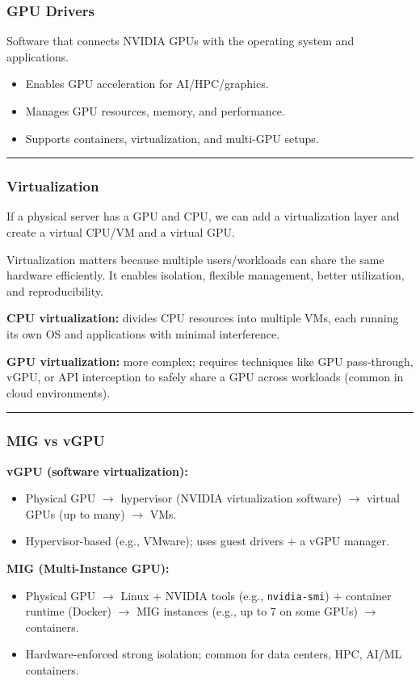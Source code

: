 \documentclass[11pt]{article}
\newcommand{\notespace}{
\vspace{0.8cm}
\hrule
\vspace{0.8cm}
}
\begin{document}
\subsubsection{GPU Drivers}
Software that connects NVIDIA GPUs with the operating system and applications.
\begin{itemize}
\item Enables GPU acceleration for AI/HPC/graphics.
\item Manages GPU resources, memory, and performance.
\item Supports containers, virtualization, and multi-GPU setups.
\end{itemize}
\notespace

\subsubsection{Virtualization}
If a physical server has a GPU and CPU, we can add a virtualization layer and create a virtual CPU/VM and a virtual GPU.

Virtualization matters because multiple users/workloads can share the same hardware efficiently. It enables isolation, flexible management, better utilization, and reproducibility.

\textbf{CPU virtualization:} divides CPU resources into multiple VMs, each running its own OS and applications with minimal interference.

\textbf{GPU virtualization:} more complex; requires techniques like GPU pass-through, vGPU, or API interception to safely share a GPU across workloads (common in cloud environments).
\notespace

\subsubsection{MIG vs vGPU}
\textbf{vGPU (software virtualization):}
\begin{itemize}
\item Physical GPU $\rightarrow$ hypervisor (NVIDIA virtualization software) $\rightarrow$ virtual GPUs (up to many) $\rightarrow$ VMs.
\item Hypervisor-based (e.g., VMware); uses guest drivers + a vGPU manager.
\end{itemize}

\textbf{MIG (Multi-Instance GPU):}
\begin{itemize}
\item Physical GPU $\rightarrow$ Linux + NVIDIA tools (e.g., \texttt{nvidia-smi}) + container runtime (Docker) $\rightarrow$ MIG instances (e.g., up to 7 on some GPUs) $\rightarrow$ containers.
\item Hardware-enforced strong isolation; common for data centers, HPC, AI/ML containers.
\end{itemize}
\end{document}
